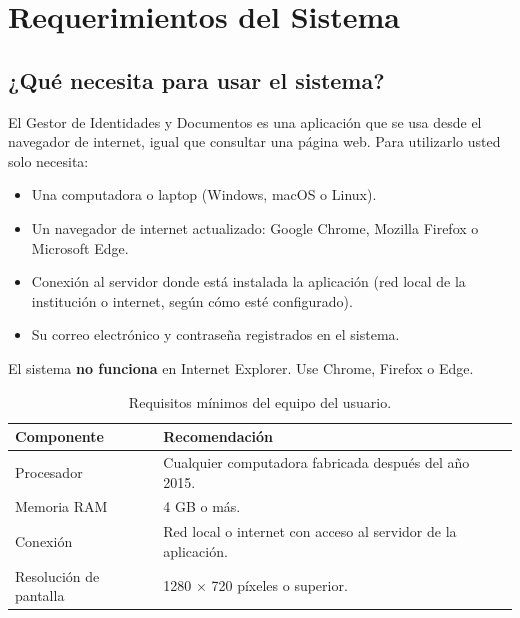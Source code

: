 \documentclass[10pt,letterpaper]{report}
\begin{document}
\chapter{Requerimientos del Sistema}

\section{¿Qué necesita para usar el sistema?}

El Gestor de Identidades y Documentos es una aplicación que se usa desde el navegador de internet, igual que consultar una página web. Para utilizarlo usted solo necesita:

\begin{itemize}
  \item Una computadora o laptop (Windows, macOS o Linux).
  \item Un navegador de internet actualizado: Google Chrome, Mozilla Firefox o Microsoft Edge.
  \item Conexión al servidor donde está instalada la aplicación (red local de la institución o internet, según cómo esté configurado).
  \item Su correo electrónico y contraseña registrados en el sistema.
\end{itemize}

\begin{importantebox}
El sistema \textbf{no funciona} en Internet Explorer. Use Chrome, Firefox o Edge.
\end{importantebox}

\begin{table}[H]
\centering
\caption{Requisitos mínimos del equipo del usuario.}
\label{tab:hardware}
\begin{tabular}{p{} p{}}
\toprule
\textbf{Componente} & \textbf{Recomendación} \\
\midrule
Procesador & Cualquier computadora fabricada después del año 2015. \\
Memoria RAM & 4 GB o más. \\
Conexión & Red local o internet con acceso al servidor de la aplicación. \\
Resolución de pantalla & 1280 × 720 píxeles o superior. \\
\bottomrule
\end{tabular}
\end{table}
\end{document}
